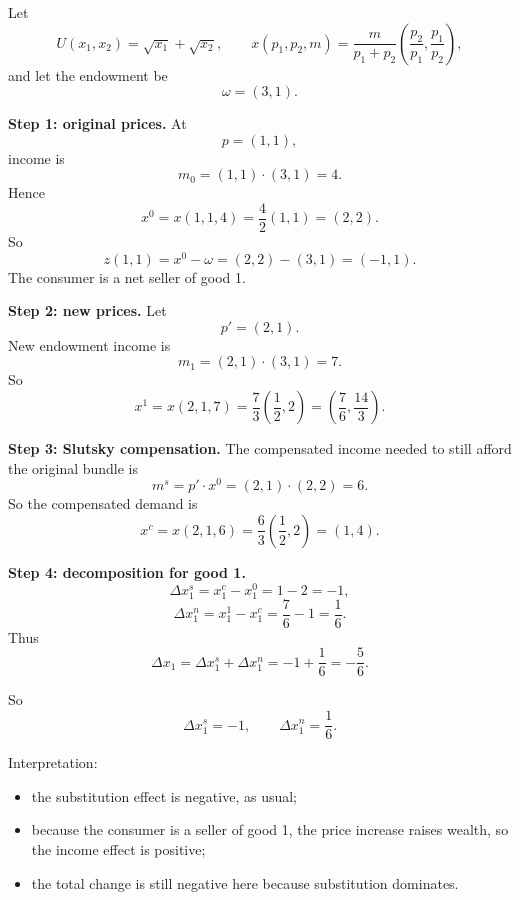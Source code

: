 \begin{examplebox}[title={Worked Example: seller of good 1 and the sign of the income effect}]
Let
\[
U(x_1,x_2)=\sqrt{x_1}+\sqrt{x_2},
\qquad
x(p_1,p_2,m)=\frac{m}{p_1+p_2}\left(\frac{p_2}{p_1},\frac{p_1}{p_2}\right),
\]
and let the endowment be
\[
\omega=(3,1).
\]

\textbf{Step 1: original prices.}  
At
\[
p=(1,1),
\]
income is
\[
m_0=(1,1)\cdot(3,1)=4.
\]
Hence
\[
x^0=x(1,1,4)=\frac{4}{2}(1,1)=(2,2).
\]
So
\[
z(1,1)=x^0-\omega=(2,2)-(3,1)=(-1,1).
\]
The consumer is a net seller of good 1.

\textbf{Step 2: new prices.}  
Let
\[
p'=(2,1).
\]
New endowment income is
\[
m_1=(2,1)\cdot(3,1)=7.
\]
So
\[
x^1=x(2,1,7)=\frac{7}{3}\left(\frac12,2\right)=\left(\frac76,\frac{14}{3}\right).
\]

\textbf{Step 3: Slutsky compensation.}  
The compensated income needed to still afford the original bundle is
\[
m^s=p'\cdot x^0=(2,1)\cdot(2,2)=6.
\]
So the compensated demand is
\[
x^c=x(2,1,6)=\frac{6}{3}\left(\frac12,2\right)=(1,4).
\]

\textbf{Step 4: decomposition for good 1.}
\[
\Delta x_1^s=x_1^c-x_1^0=1-2=-1,
\]
\[
\Delta x_1^n=x_1^1-x_1^c=\frac76-1=\frac16.
\]
Thus
\[
\Delta x_1=\Delta x_1^s+\Delta x_1^n=-1+\frac16=-\frac56.
\]

So
\[
\boxed{
\Delta x_1^s=-1,
\qquad
\Delta x_1^n=\frac16.
}
\]

Interpretation:
\begin{itemize}
    \item the substitution effect is negative, as usual;
    \item because the consumer is a seller of good 1, the price increase raises wealth, so the income effect is positive;
    \item the total change is still negative here because substitution dominates.
\end{itemize}
\end{examplebox}

